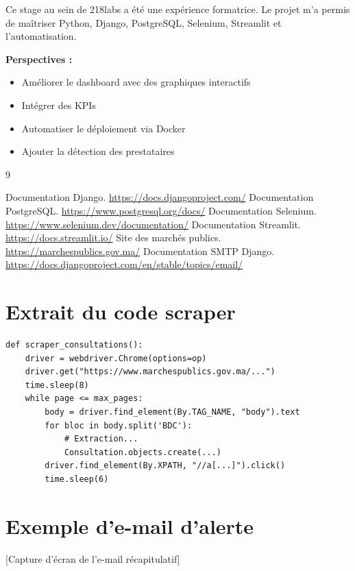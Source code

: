 \documentclass[12pt,a4paper]{report}
\begin{document}
Ce stage au sein de 218labs a été une expérience formatrice. Le projet m'a permis de maîtriser Python, Django, PostgreSQL, Selenium, Streamlit et l'automatisation.

\textbf{Perspectives :}
\begin{itemize}
\item Améliorer le dashboard avec des graphiques interactifs
\item Intégrer des KPIs
\item Automatiser le déploiement via Docker
\item Ajouter la détection des prestataires
\end{itemize}

\begin{thebibliography}{9}

 Documentation Django. \url{https://docs.djangoproject.com/}
 Documentation PostgreSQL. \url{https://www.postgresql.org/docs/}
 Documentation Selenium. \url{https://www.selenium.dev/documentation/}
 Documentation Streamlit. \url{https://docs.streamlit.io/}
 Site des marchés publics. \url{https://marchespublics.gov.ma/}
 Documentation SMTP Django. \url{https://docs.djangoproject.com/en/stable/topics/email/}
\end{thebibliography}

\appendix
\chapter{Extrait du code scraper}
\label{annexe:code}

\begin{verbatim}
def scraper_consultations():
    driver = webdriver.Chrome(options=op)
    driver.get("https://www.marchespublics.gov.ma/...")
    time.sleep(8)
    while page <= max_pages:
        body = driver.find_element(By.TAG_NAME, "body").text
        for bloc in body.split('BDC'):
            # Extraction...
            Consultation.objects.create(...)
        driver.find_element(By.XPATH, "//a[...]").click()
        time.sleep(6)
\end{verbatim}

\chapter{Exemple d'e-mail d'alerte}
\label{annexe:email}

[Capture d'écran de l'e-mail récapitulatif]
\end{document}
